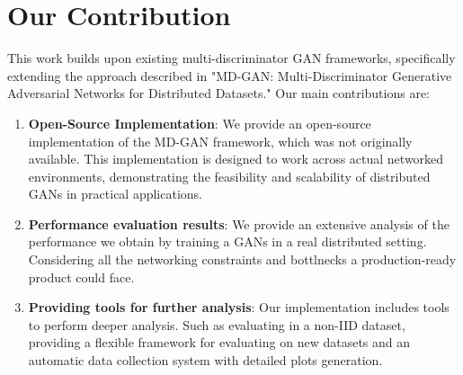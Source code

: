 \section{Our Contribution}
This work builds upon existing multi-discriminator GAN frameworks, specifically extending the approach described in "MD-GAN: Multi-Discriminator Generative Adversarial Networks for Distributed Datasets." \cite{mdgan} Our main contributions are:
\begin{enumerate}
    \item \textbf{Open-Source Implementation}: We provide an open-source implementation of the MD-GAN framework, which was not originally available. This implementation is designed to work across actual networked environments, demonstrating the feasibility and scalability of distributed GANs in practical applications.
    \item \textbf{Performance evaluation results}: We provide an extensive analysis of the performance we obtain by training a GANs in a real distributed setting. Considering all the networking constraints and bottlnecks a production-ready product could face.
    \item \textbf{Providing tools for further analysis}: Our implementation includes tools to perform deeper analysis. Such as evaluating in a non-IID dataset, providing a flexible framework for evaluating on new datasets and an automatic data collection system with detailed plots generation.
\end{enumerate}

\newpage

